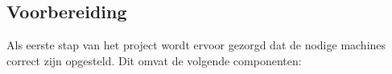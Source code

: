 
\chapter{}%
\label{ch:methodologie}


\section{Voorbereiding}
\label{sec:voorbereiding}

Als eerste stap van het project wordt ervoor gezorgd dat de nodige machines correct zijn opgesteld. Dit omvat de volgende componenten:

